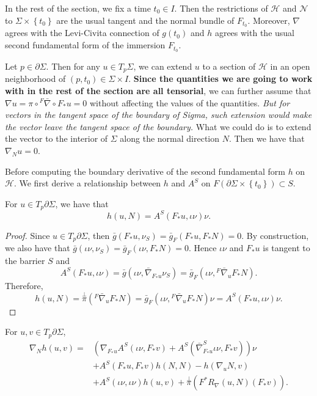 In the rest of the section, we fix a time $t_0 \in I$. Then the restrictions of $\mathcal{H} $ and $\mathcal{N} $  to $\Sigma \times \left\{ t_0 \right\} $ are the usual tangent and the normal bundle of $F_{t_0}$. Moreover, $\nabla $ agrees with the Levi-Civita connection of $g(t_0)$ and $h$ agrees with the usual second fundamental form of the immersion $F_{t_0}$. 

Let $p \in \partial \Sigma $. Then for any $u \in T_p \Sigma $, we can extend $u$ to a section of $\mathcal{H} $ in an open neighborhood of $(p,t_0) \in \Sigma \times I$. \textbf{Since the quantities we are going to work with in the rest of the section are all tensorial}, we can further assume that $\nabla u = \pi \circ {}^F \bar{\nabla } \circ F_* u = 0$ without affecting the values of the quantities. \textit{But for vectors in the tangent space of the boundary of Sigma, such extension would make the vector leave the tangent space of the boundary.} What we could do is to extend the vector to the interior of $\Sigma $ along the normal direction $N$. Then we have that $\nabla _N u=0$.  

Before computing the boundary derivative of the second fundamental form $h$ on $\mathcal{H} $. We first derive a relationship between $h$ and $A^S$ on $F(\partial \Sigma \times \left\{ t_0 \right\} ) \subset S $.

\begin{lemma} \label{htoas}
    For $u \in T_p \partial \Sigma $, we have that 
    \[h(u,N)=A^S(F_{*}u, \iota \nu ) \nu. \] 
\end{lemma}

\begin{proof}
    Since $u \in T_p \partial \Sigma$, then $\bar{g}(F_* u, \nu _S)=\bar{g}_F(F_* u, F_* N)=0$. By construction, we also have that $\bar{g}(\iota \nu , \nu _S)=\bar{g}_F(\iota \nu , F_* N)=0$. Hence $\iota \nu $ and $F_*u$ is tangent to the barrier $S$ and 
    \[A^S(F_{*}u, \iota \nu )=\bar{g}(\iota \nu , \bar{\nabla }_{F_*u}\nu _S)=\bar{g}_F(\iota \nu ,{}^F \bar{\nabla } _u F_* N).\]
    Therefore,
    \[h(u,N)=\overset{\perp }{\pi} ({}^F \bar{\nabla } _u F_* N)= \bar{g}_F(\iota \nu ,{}^F \bar{\nabla } _u F_* N) \nu = A^S(F_{*}u, \iota \nu ) \nu .\] 
\end{proof}

\begin{theorem}
    For $u,v \in T_p \partial \Sigma $, 
    \begin{equation*}
        \begin{split}
            \nabla _N h(u,v)
            =& \left( \nabla _{F_*u}A^S(\iota \nu , F_*v)+A^S(\bar{\nabla }^{S}_{F_*u} \iota \nu , F_*v)  \right)   \nu \\
            & +A^S(F_*u, F_* v)h(N,N)-h(\nabla_u N, v) \\
            & + A^S(\iota  \nu  , \iota \nu )h(u,v) +\overset{\perp }{\pi} (F^*R_{\nabla }(u,N)(F_* v)).
    \end{split}
    \end{equation*}    
\end{theorem}

